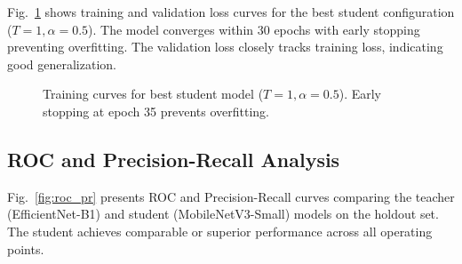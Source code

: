 \documentclass[conference]{IEEEtran}
\begin{document}
Fig.~\ref{fig:training_curves} shows training and validation loss curves for the best student configuration ($T=1, \alpha=0.5$). The model converges within 30 epochs with early stopping preventing overfitting. The validation loss closely tracks training loss, indicating good generalization.

\begin{figure}[t]
\centering
{}
\caption{Training curves for best student model ($T=1, \alpha=0.5$). Early stopping at epoch 35 prevents overfitting.}
\label{fig:training_curves}
\end{figure}

\subsection{ROC and Precision-Recall Analysis}

Fig.~\ref{fig:roc_pr} presents ROC and Precision-Recall curves comparing the teacher (EfficientNet-B1) and student (MobileNetV3-Small) models on the holdout set. The student achieves comparable or superior performance across all operating points.
\end{document}
